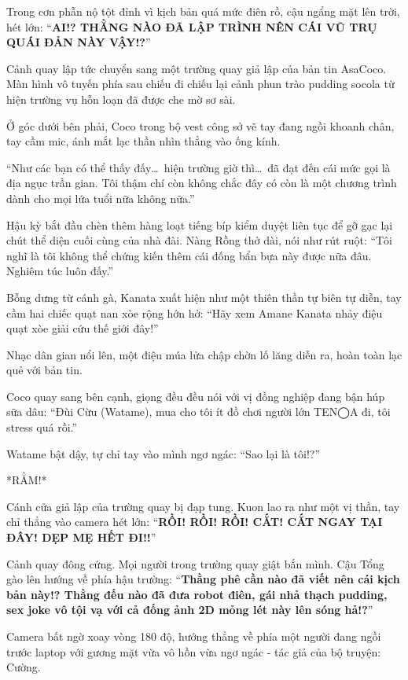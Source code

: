 \documentclass[../main.tex]{subfiles}
\begin{document}
Trong cơn phẫn nộ tột đỉnh vì kịch bản quá mức điên rồ, cậu ngẩng mặt lên trời, hét lớn: ``\textbf{AI!? THẰNG NÀO ĐÃ LẬP TRÌNH NÊN CÁI VŨ TRỤ QUÁI ĐẢN NÀY VẬY!?}''

Cảnh quay lập tức chuyển sang một trường quay giả lập của bản tin AsaCoco. Màn hình vô tuyến phía sau chiếu đi chiếu lại cảnh phun trào pudding socola từ hiện trường vụ hỗn loạn đã được che mờ sơ sài.

Ở góc dưới bên phải, Coco trong bộ vest công sở vẽ tay đang ngồi khoanh chân, tay cầm mic, ánh mắt lạc thần nhìn thẳng vào ống kính.


``Như các bạn có thể thấy đấy\dots\ hiện trường giờ thì\dots\ đã đạt đến cái mức gọi là địa ngục trần gian. Tôi thậm chí còn không chắc đây có còn là một chương trình dành cho mọi lứa tuổi nữa không nữa.''

Hậu kỳ bắt đầu chèn thêm hàng loạt tiếng bíp kiểm duyệt liên tục để gỡ gạc lại chút thể diện cuối cùng của nhà đài. Nàng Rồng thở dài, nói như rút ruột: ``Tôi nghĩ là tôi không thể chứng kiến thêm cái đống bẩn bựa này được nữa đâu. Nghiêm túc luôn đấy.''

Bỗng dưng từ cánh gà, Kanata xuất hiện như một thiên thần tự biên tự diễn, tay cầm hai chiếc quạt nan xòe rộng hớn hở: ``Hãy xem Amane Kanata nhảy điệu quạt xòe giải cứu thế giới đây!''


Nhạc dân gian nổi lên, một điệu múa lửa chập chờn lố lăng diễn ra, hoàn toàn lạc quẻ với bản tin.

Coco quay sang bên cạnh, giọng đều đều nói với vị đồng nghiệp đang bận húp sữa dâu: ``Đùi Cừu (Watame), mua cho tôi ít đồ chơi người lớn TEN◯A đi, tôi stress quá rồi.''

Watame bật dậy, tự chỉ tay vào mình ngơ ngác: ``Sao lại là tôi!?''

*RẰM!*

Cánh cửa giả lập của trường quay bị đạp tung. Kuon lao ra như một vị thần, tay chỉ thẳng vào camera hét lớn: ``\textbf{RỒI! RỒI! RỒI! CẮT! CẮT NGAY TẠI ĐÂY! DẸP MẸ HẾT ĐI!!}''

Cảnh quay đông cứng. Mọi người trong trường quay giật bắn mình. Cậu Tổng gào lên hướng về phía hậu trường: ``\textbf{Thằng phê cần nào đã viết nên cái kịch bản này!? Thằng đếu nào đã đưa robot điên, gái nhả thạch pudding, sex joke vô tội vạ với cả đống ảnh 2D mỏng lét này lên sóng hả!?}''

Camera bất ngờ xoay vòng 180 độ, hướng thẳng về phía một người đang ngồi trước laptop với gương mặt vừa vô hồn vừa ngơ ngác - tác giả của bộ truyện: Cường.
\end{document}
